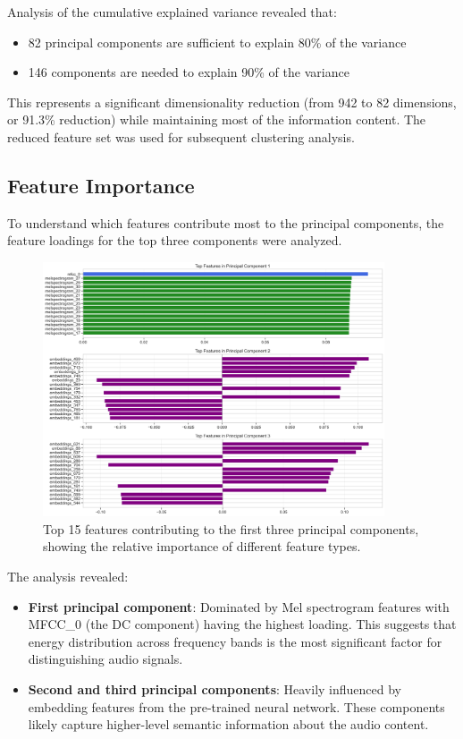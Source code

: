 \documentclass{article}
\begin{document}
Analysis of the cumulative explained variance revealed that:
\begin{itemize}
    \item 82 principal components are sufficient to explain 80\% of the variance
    \item 146 components are needed to explain 90\% of the variance
\end{itemize}

This represents a significant dimensionality reduction (from 942 to 82 dimensions, or 91.3\% reduction) while maintaining most of the information content. The reduced feature set was used for subsequent clustering analysis.

\subsection{Feature Importance}

To understand which features contribute most to the principal components, the feature loadings for the top three components were analyzed.

\begin{figure}[ht]
  \centering
  \includegraphics[width=0.9\textwidth]{figures/audio_features/feature_importance.png}
  \caption{Top 15 features contributing to the first three principal components, showing the relative importance of different feature types.}
  \label{fig:feature_importance}
\end{figure}

The analysis revealed:
\begin{itemize}
    \item \textbf{First principal component}: Dominated by Mel spectrogram features with MFCC\_0 (the DC component) having the highest loading. This suggests that energy distribution across frequency bands is the most significant factor for distinguishing audio signals.
    
    \item \textbf{Second and third principal components}: Heavily influenced by embedding features from the pre-trained neural network. These components likely capture higher-level semantic information about the audio content.
\end{itemize}
\end{document}
